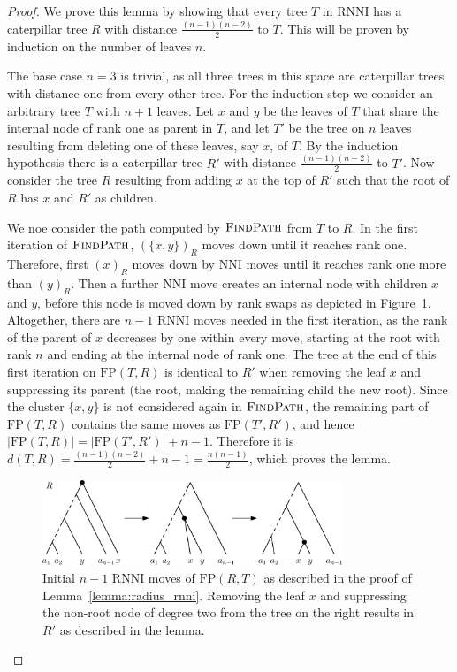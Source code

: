 \documentclass[11pt]{amsart}
\newcommand{\rnni}{\mathrm{RNNI}}
\newcommand{\findpath}{\textsc{FindPath}}
\newcommand{\nni}{\mathrm{NNI}}
\newcommand{\fp}{\mathrm{FP}}
\begin{document}
\begin{proof}
	We prove this lemma by showing that every tree $T$ in $\rnni$ has a caterpillar tree $R$ with distance $\frac{(n-1)(n-2)}{2}$ to $T$.
	This will be proven by induction on the number of leaves $n$.

	The base case $n=3$ is trivial, as all three trees in this space are caterpillar trees with distance one from every other tree.
	For the induction step we consider an arbitrary tree $T$ with $n+1$ leaves.
	Let $x$ and $y$ be the leaves of $T$ that share the internal node of rank one as parent in $T$, and let $T'$ be the tree on $n$ leaves resulting from deleting one of these leaves, say $x$, of $T$.
	By the induction hypothesis there is a caterpillar tree $R'$ with distance $\frac{(n-1)(n-2)}{2}$ to $T'$.
	Now consider the tree $R$ resulting from adding $x$ at the top of $R'$ such that the root of $R$ has $x$ and $R'$ as children.

	We noe consider the path computed by $\findpath$ from $T$ to $R$.
	In the first iteration of $\findpath$, $(\{x,y\})_R$ moves down until it reaches rank one.
	Therefore, first $(x)_R$ moves down by $\nni$ moves until it reaches rank one more than $(y)_R$.
	Then a further $\nni$ move creates an internal node with children $x$ and $y$, before this node is moved down by rank swaps as depicted in Figure~\ref{fig:max_dist_ctree}.
	Altogether, there are $n-1$ $\rnni$ moves needed in the first iteration, as the rank of the parent of $x$ decreases by one within every move, starting at the root with rank $n$ and ending at the internal node of rank one.
	The tree at the end of this first iteration on $\fp(T,R)$ is identical to $R'$ when removing the leaf $x$ and suppressing its parent (the root, making the remaining child the new root).
	Since the cluster $\{x,y\}$ is not considered again in $\findpath$, the remaining part of $\fp(T,R)$ contains the same moves as $\fp(T',R')$, and hence $|\fp(T,R)| = |\fp(T',R')| + n-1$.
	Therefore it is $d(T,R) = \frac{(n-1)(n-2)}{2} + n-1 = \frac{n(n-1)}{2}$, which proves the lemma.
	\begin{figure}[ht]
		\includegraphics[width=0.8\textwidth]{max_dist_ctree.eps}
		\caption{Initial $n - 1$ $\rnni$ moves of $\fp(R,T)$ as described in the proof of Lemma~\ref{lemma:radius_rnni}.
		Removing the leaf $x$ and suppressing the non-root node of degree two from the tree on the right results in $R'$ as described in the lemma.}
		\label{fig:max_dist_ctree}
	\end{figure}
\end{proof}
\end{document}
